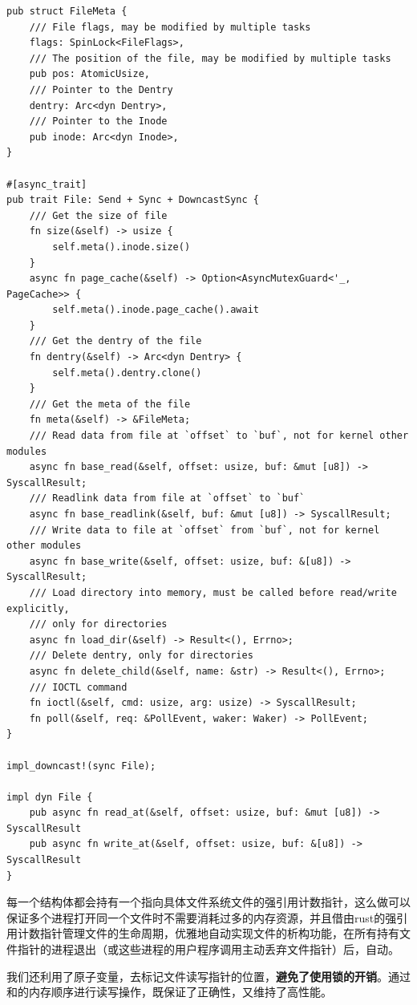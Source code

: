 \documentclass{article}
\begin{document}
\begin{lstlisting}
pub struct FileMeta {
    /// File flags, may be modified by multiple tasks
    flags: SpinLock<FileFlags>,
    /// The position of the file, may be modified by multiple tasks
    pub pos: AtomicUsize,
    /// Pointer to the Dentry
    dentry: Arc<dyn Dentry>,
    /// Pointer to the Inode
    pub inode: Arc<dyn Inode>,
}

#[async_trait]
pub trait File: Send + Sync + DowncastSync {
    /// Get the size of file
    fn size(&self) -> usize {
        self.meta().inode.size()
    }
    async fn page_cache(&self) -> Option<AsyncMutexGuard<'_, PageCache>> {
        self.meta().inode.page_cache().await
    }
    /// Get the dentry of the file
    fn dentry(&self) -> Arc<dyn Dentry> {
        self.meta().dentry.clone()
    }
    /// Get the meta of the file
    fn meta(&self) -> &FileMeta;
    /// Read data from file at `offset` to `buf`, not for kernel other modules
    async fn base_read(&self, offset: usize, buf: &mut [u8]) -> SyscallResult;
    /// Readlink data from file at `offset` to `buf`
    async fn base_readlink(&self, buf: &mut [u8]) -> SyscallResult;
    /// Write data to file at `offset` from `buf`, not for kernel other modules
    async fn base_write(&self, offset: usize, buf: &[u8]) -> SyscallResult;
    /// Load directory into memory, must be called before read/write explicitly,
    /// only for directories
    async fn load_dir(&self) -> Result<(), Errno>;
    /// Delete dentry, only for directories
    async fn delete_child(&self, name: &str) -> Result<(), Errno>;
    /// IOCTL command
    fn ioctl(&self, cmd: usize, arg: usize) -> SyscallResult;
    fn poll(&self, req: &PollEvent, waker: Waker) -> PollEvent;
}

impl_downcast!(sync File);

impl dyn File {
    pub async fn read_at(&self, offset: usize, buf: &mut [u8]) -> SyscallResult
    pub async fn write_at(&self, offset: usize, buf: &[u8]) -> SyscallResult
}
\end{lstlisting}

每一个结构体都会持有一个指向具体文件系统文件的强引用计数指针，这么做可以保证多个进程打开同一个文件时不需要消耗过多的内存资源，并且借由rust的强引用计数指针管理文件的生命周期，优雅地自动实现文件的析构功能，在所有持有文件指针的进程退出（或这些进程的用户程序调用主动丢弃文件指针）后，自动。

我们还利用了原子变量，去标记文件读写指针的位置，\textbf{避免了使用锁的开销}。通过和的内存顺序进行读写操作，既保证了正确性，又维持了高性能。
\end{document}
